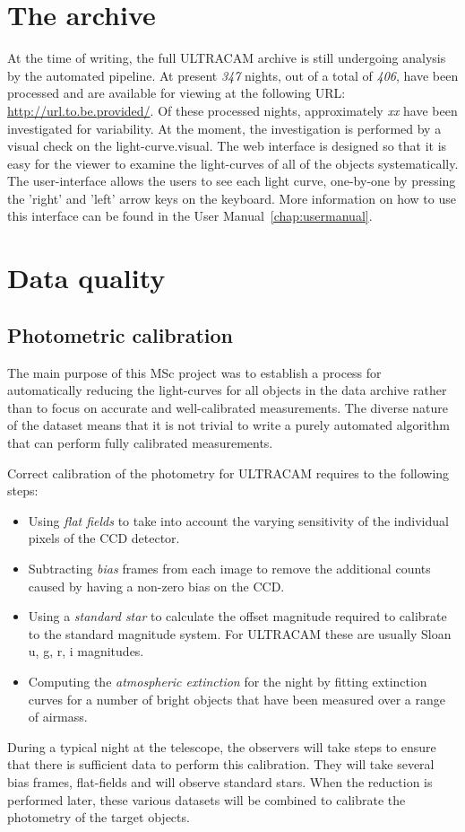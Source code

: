 \section{The archive} 

At the time of writing, the full ULTRACAM archive is still undergoing analysis by the automated pipeline. At present \emph{347} nights, out of a total of \emph{406}, have been processed and are available for viewing at the following URL: \url{http://url.to.be.provided/}. Of these processed nights, approximately \emph{xx} have been investigated for variability. At the moment, the investigation is performed by a visual check on the light-curve.visual. The web interface is designed so that it is easy for the viewer to examine the light-curves of all of the objects systematically. The user-interface allows the users to see each light curve, one-by-one by pressing the 'right' and 'left'  arrow keys on the keyboard. More information on how to use this interface can be found in the User Manual~\ref{chap:usermanual}. 

\section{Data quality}

\subsection{Photometric calibration}
The main purpose of this MSc project was to establish a process for automatically reducing the light-curves for all objects in the data archive rather than to focus on accurate and well-calibrated measurements. The diverse nature of the dataset means that it is not trivial to write a purely automated algorithm that can perform fully calibrated measurements. 

Correct calibration of the photometry for ULTRACAM requires to the following steps:
\begin{itemize}
  \item Using \emph{flat fields} to take into account the varying sensitivity of the individual pixels of the CCD detector. 
  \item Subtracting \emph{bias} frames from each image to remove the additional counts caused by having a non-zero bias on the CCD. 
  \item Using a \emph{standard star} to calculate the offset magnitude required to calibrate to the standard magnitude system. For ULTRACAM these are usually Sloan u, g, r, i magnitudes.
  \item Computing the \emph{atmospheric extinction} for the night by fitting extinction curves for a number of bright objects that have been measured over a range of airmass. 
\end{itemize}
During a typical night at the telescope, the observers will take steps to ensure that there is sufficient data to perform this calibration. They will take several bias frames, flat-fields and will observe standard stars. When the reduction is performed later, these various datasets will be combined to calibrate the photometry of the target objects. 

